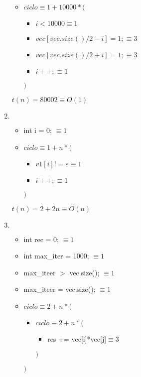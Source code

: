 \documentclass{article}
\begin{document}
\begin{enumerate}
\begin{itemize}
            \item $ciclo \equiv 1 + 10000*($
                \begin{itemize}
                    \item $i < 10000 \equiv 1$
                    \item $vec[vec.size()/2-i] = 1; \equiv 3$
                    \item $vec[vec.size()/2+i] = 1; \equiv 3$
                    \item $i++; \equiv 1$
                \end{itemize}
                $)$
        \end{itemize}
        $t(n) = 80002 \equiv O(1)$
    \item $ $
        
        \begin{itemize}
            \item int i = 0; $\equiv 1$
            \item $ciclo \equiv 1 + n *($
                \begin{itemize}
                    \item $v1[i] != e \equiv 1$
                    \item $i++; \equiv 1$
                \end{itemize}
            $)$
        \end{itemize}
        $t(n)= 2 + 2n \equiv O(n)$
    \item $ $
        
        \begin{itemize}
            \item int rec = 0; $\equiv 1$
            \item int max\_iter = 1000; $\equiv 1$
            \item max\_iteer $>$ vec.size(); $\equiv 1$
            \item max\_iteer = vec.size(); $\equiv 1$
            \item $ciclo \equiv 2 + n *($
                \begin{itemize}
                    \item $ciclo \equiv 2 + n *($
                        \begin{itemize}
                            \item res += vec[i]*vec[j]$\equiv 3$
                        \end{itemize}
                    $)$
                \end{itemize}
            $)$

\end{itemize}
\end{enumerate}
\end{document}
